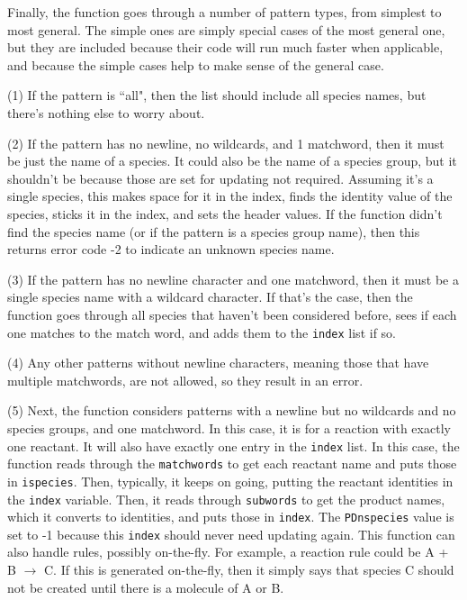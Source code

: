 \documentclass {book}
\newcommand {\ttt} {\texttt}
\begin{document}
\begin{description}
Finally, the function goes through a number of pattern types, from simplest to most general. The simple ones are simply special cases of the most general one, but they are included because their code will run much faster when applicable, and because the simple cases help to make sense of the general case.

(1) If the pattern is ``all", then the list should include all species names, but there's nothing else to worry about.

(2) If the pattern has no newline, no wildcards, and 1 matchword, then it must be just the name of a species. It could also be the name of a species group, but it shouldn't be because those are set for updating not required. Assuming it's a single species, this makes space for it in the index, finds the identity value of the species, sticks it in the index, and sets the header values. If the function didn't find the species name (or if the pattern is a species group name), then this returns error code -2 to indicate an unknown species name.

(3) If the pattern has no newline character and one matchword, then it must be a single species name with a wildcard character. If that's the case, then the function goes through all species that haven't been considered before, sees if each one matches to the match word, and adds them to the \ttt{index} list if so.

(4) Any other patterns without newline characters, meaning those that have multiple matchwords, are not allowed, so they result in an error.

(5) Next, the function considers patterns with a newline but no wildcards and no species groups, and one matchword. In this case, it is for a reaction with exactly one reactant. It will also have exactly one entry in the \ttt{index} list. In this case, the function reads through the \ttt{matchwords} to get each reactant name and puts those in \ttt{ispecies}. Then, typically, it keeps on going, putting the reactant identities in the \ttt{index} variable. Then, it reads through \ttt{subwords} to get the product names, which it converts to identities, and puts those in \ttt{index}. The \ttt{PDnspecies} value is set to -1 because this \ttt{index} should never need updating again. This function can also handle rules, possibly on-the-fly. For example, a reaction rule could be A + B $\rightarrow$ C. If this is generated on-the-fly, then it simply says that species C should not be created until there is a molecule of A or B.


\end{description}
\end{document}
